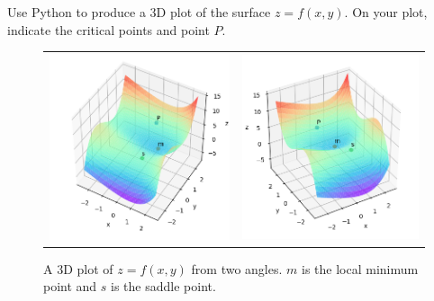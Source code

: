 \documentclass[a4paper]{article}
\begin{document}
\newpage
\subsection{~} %

\begin{questionbody}
Use Python to produce a 3D plot of the surface $z = f(x, y)$. On your plot, indicate the critical points and point $P$.
\end{questionbody}

\begin{figure}[h]
    \centering
    \begin{tabular}{cc}
        \includegraphics[scale=0.6]{Q2d-1} &
        \includegraphics[scale=0.6]{Q2d-2}
    \end{tabular}
    \caption{A 3D plot of $z=f(x,y)$ from two angles. $m$ is the local minimum point and $s$ is the saddle point.}%
    \label{fig:3d-plot}
\end{figure}
\end{document}
